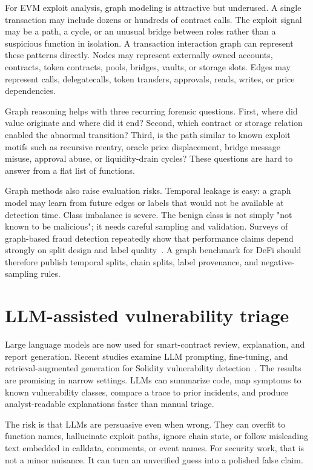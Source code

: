 \documentclass[conference]{IEEEtran}
\begin{document}
For EVM exploit analysis, graph modeling is attractive but underused. A single transaction may include dozens or hundreds of contract calls. The exploit signal may be a path, a cycle, or an unusual bridge between roles rather than a suspicious function in isolation. A transaction interaction graph can represent these patterns directly. Nodes may represent externally owned accounts, contracts, token contracts, pools, bridges, vaults, or storage slots. Edges may represent calls, delegatecalls, token transfers, approvals, reads, writes, or price dependencies.

Graph reasoning helps with three recurring forensic questions. First, where did value originate and where did it end? Second, which contract or storage relation enabled the abnormal transition? Third, is the path similar to known exploit motifs such as recursive reentry, oracle price displacement, bridge message misuse, approval abuse, or liquidity-drain cycles? These questions are hard to answer from a flat list of functions.

Graph methods also raise evaluation risks. Temporal leakage is easy: a graph model may learn from future edges or labels that would not be available at detection time. Class imbalance is severe. The benign class is not simply "not known to be malicious"; it needs careful sampling and validation. Surveys of graph-based fraud detection repeatedly show that performance claims depend strongly on split design and label quality~\cite{ellipticpp}. A graph benchmark for DeFi should therefore publish temporal splits, chain splits, label provenance, and negative-sampling rules.

\section{LLM-assisted vulnerability triage}

Large language models are now used for smart-contract review, explanation, and report generation. Recent studies examine LLM prompting, fine-tuning, and retrieval-augmented generation for Solidity vulnerability detection~\cite{smartvd,detectllama,ragllm,smartllama}. The results are promising in narrow settings. LLMs can summarize code, map symptoms to known vulnerability classes, compare a trace to prior incidents, and produce analyst-readable explanations faster than manual triage.

The risk is that LLMs are persuasive even when wrong. They can overfit to function names, hallucinate exploit paths, ignore chain state, or follow misleading text embedded in calldata, comments, or event names. For security work, that is not a minor nuisance. It can turn an unverified guess into a polished false claim.
\end{document}
